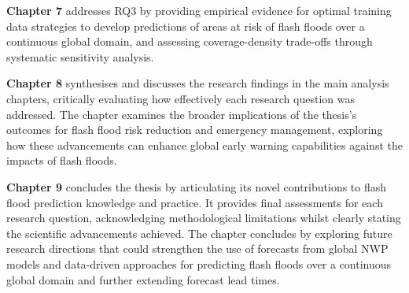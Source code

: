 \textbf{Chapter 7}\marginpara{\textcolor{colour_chapter7}{Main Analysis Chapter - Towards predictions over a continuous global domain: global implementation of the regionally-trained models}} addresses RQ3 by providing empirical evidence for optimal training data strategies to develop predictions of areas at risk of flash floods over a continuous global domain, and assessing coverage-density trade-offs through systematic sensitivity analysis.

\textbf{Chapter 8} synthesises and discusses the research findings in the main analysis chapters, critically evaluating how effectively each research question was addressed. The chapter examines the broader implications of the thesis's outcomes for flash flood risk reduction and emergency management, exploring how these advancements can enhance global early warning capabilities against the impacts of flash floods. 

\textbf{Chapter 9} concludes the thesis by articulating its novel contributions to flash flood prediction knowledge and practice. It provides final assessments for each research question, acknowledging methodological limitations whilst clearly stating the scientific advancements achieved. The chapter concludes by exploring future research directions that could strengthen the use of forecasts from global NWP models and data-driven approaches for predicting flash floods over a continuous global domain and further extending forecast lead times. 